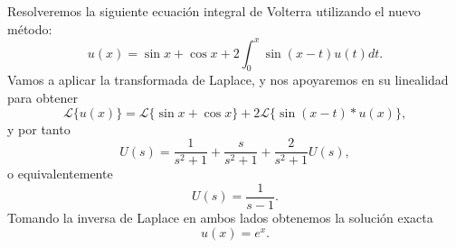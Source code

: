 \begin{ejemplo}
	Resolveremos la siguiente ecuación integral de Volterra utilizando el nuevo método:
	\begin{equation}
		u(x) = \sin x + \cos x + 2 \int_{0}^{x} \sin (x-t)u(t)dt.
	\end{equation}
	Vamos a aplicar la transformada de Laplace, y nos apoyaremos en su linealidad para obtener
	\begin{equation}
		\mathcal{L}\{u(x)\} = \mathcal{L}\{\sin x + \cos x\} + 2\mathcal{L}\{\sin (x-t) \ast u(x)\},
	\end{equation}
	y por tanto
	\begin{equation}
		U(s) = \dfrac{1}{s^2+1}+\dfrac{s}{s^2+1}+\dfrac{2}{s^2+1}U(s),
	\end{equation}
	o equivalentemente
	\begin{equation}
		U(s) = \dfrac{1}{s-1}.
	\end{equation}
	Tomando la inversa de Laplace en ambos lados obtenemos la solución exacta
	\begin{equation}
		u(x) = e^x.
	\end{equation}
\end{ejemplo}

\endinput
